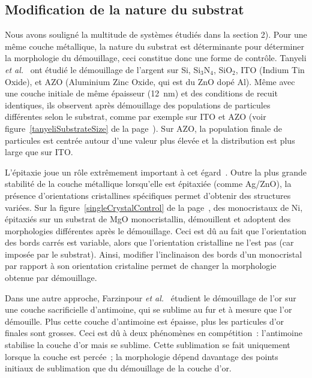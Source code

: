 	\subsection{Modification de la nature du substrat}
	\label{sNatureSubstrat}
Nous avons souligné la multitude de systèmes étudiés dans la section 2). Pour une même couche métallique, la nature du substrat est déterminante pour déterminer la morphologie du démouillage, ceci constitue donc une forme de contrôle. Tanyeli \textit{et al.}~\cite{tanyeli2013effect} ont étudié le démouillage de l'argent sur Si, Si$_3$N$_4$, SiO$_2$, ITO (Indium Tin Oxide), et AZO (Aluminium Zinc Oxide, qui est du ZnO dopé Al). Même avec une couche initiale de même épaisseur (12~nm) et des conditions de recuit identiques, ils observent après démouillage des populations de particules différentes selon le substrat, comme par exemple sur ITO et AZO (voir figure~\ref{tanyeliSubstrateSize} de la page~\pageref{tanyeliSubstrateSize}). Sur AZO, la population finale de particules est centrée autour d'une valeur plus élevée et la distribution est plus large que sur ITO.\par 
L'épitaxie joue un rôle extrêmement important à cet égard~\cite{thompson1990grain, leroy2016control}. Outre la plus grande stabilité de la couche métallique lorsqu'elle est épitaxiée (comme Ag/ZnO), la présence d'orientations cristallines spécifiques permet d'obtenir des structures variées. Sur la figure~\ref{singleCrystalControl} de la page~\pageref{singleCrystalControl}, des monocristaux de Ni, épitaxiés sur un substrat de MgO monocristallin, démouillent et adoptent des morphologies différentes après le démouillage. Ceci est dû au fait que l'orientation des bords carrés est variable, alors que l'orientation cristalline ne l'est pas (car imposée par le substrat). Ainsi, modifier l'inclinaison des bords d'un monocristal par rapport à son orientation cristaline permet de changer la morphologie obtenue par démouillage.\par 
Dans une autre approche, Farzinpour \textit{et al.}~\cite{farzinpour2012altering} étudient le démouillage de l'or sur une couche sacrificielle d'antimoine, qui se sublime au fur et à mesure que l'or démouille. Plus cette couche d'antimoine est épaisse, plus les particules d'or finales sont grosses. Ceci est dû à deux phénomènes en compétition~: l'antimoine stabilise la couche d'or mais se sublime. Cette sublimation se fait uniquement lorsque la couche est percée~; la morphologie dépend davantage des points initiaux de sublimation que du démouillage de la couche d'or.\par 

